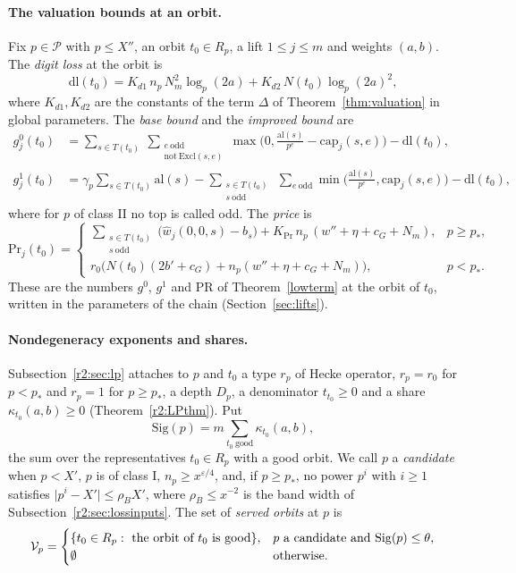 \paragraph{The valuation bounds at an orbit.} Fix $p\in\mathcal P$ with $p\le X''$, an orbit $t_0\in R_p$, a lift $1\le j\le m$ and weights $(a,b)$. The \emph{digit loss} at the orbit is
\[
\mathrm{dl}(t_0)=K_{d1}\,n_p\,N_m^2\log_p(2a)+K_{d2}\,N(t_0)\log_p(2a)^2,
\]
where $K_{d1},K_{d2}$ are the constants of the term $\Delta$ of Theorem~\ref{thm:valuation} in global parameters. The \emph{base bound} and the \emph{improved bound} are
\begin{align}
g^0_j(t_0)&=\sum_{s\in T(t_0)}\ \sum_{\substack{e\ \mathrm{odd}\\ \mathrm{not}\ \mathrm{Excl}(s,e)}}\max\Big(0,\frac{\mathrm{al}(s)}{p^e}-\mathrm{cap}_j(s,e)\Big)-\mathrm{dl}(t_0),\label{r2:g0}\\
g^1_j(t_0)&=\gamma_p\sum_{s\in T(t_0)}\mathrm{al}(s)-\sum_{\substack{s\in T(t_0)\\ s\ \mathrm{odd}}}\ \sum_{e\ \mathrm{odd}}\min\Big(\frac{\mathrm{al}(s)}{p^e},\mathrm{cap}_j(s,e)\Big)-\mathrm{dl}(t_0),\label{r2:g1}
\end{align}
where for $p$ of class II no top is called odd. The \emph{price} is
\begin{equation}\label{r2:price}
\mathrm{Pr}_j(t_0)=\begin{cases}\displaystyle\sum_{\substack{s\in T(t_0)\\ s\ \mathrm{odd}}}\big(\hat w_j(0,0,s)-b_s\big)+K_{\mathrm{Pr}}\,n_p\,(w''+\eta+c_G+N_m),&p\ge p_*,\\[2ex]
r_0\big(N(t_0)(2b'+c_G)+n_p(w''+\eta+c_G+N_m)\big),&p<p_*.\end{cases}
\end{equation}
These are the numbers $g^0$, $g^1$ and $\mathrm{PR}$ of Theorem~\ref{lowterm} at the orbit of $t_0$, written in the parameters of the chain (Section~\ref{sec:lifts}).

\paragraph{Nondegeneracy exponents and shares.} Subsection~\ref{r2:sec:lp} attaches to $p$ and $t_0$ a type $r_p$ of Hecke operator, $r_p=r_0$ for $p<p_*$ and $r_p=1$ for $p\ge p_*$, a depth $D_p$, a denominator $t_{t_0}\ge0$ and a share $\kappa_{t_0}(a,b)\ge0$ (Theorem~\ref{r2:LPthm}). Put
\[
\mathrm{Sig}(p)=m\sum_{t_0\ \mathrm{good}}\kappa_{t_0}(a,b),
\]
the sum over the representatives $t_0\in R_p$ with a good orbit. We call $p$ a \emph{candidate} when $p<X'$, $p$ is of class I, $n_p\ge x^{\varepsilon/4}$, and, if $p\ge p_*$, no power $p^i$ with $i\ge1$ satisfies $\lvert p^i-X'\rvert\le\rho_BX'$, where $\rho_B\le x^{-2}$ is the band width of Subsection~\ref{r2:sec:lossinputs}. The set of \emph{served orbits} at $p$ is
\[
\cV_p=\begin{cases}\{t_0\in R_p:\ \text{the orbit of }t_0\text{ is good}\},&p\text{ a candidate and }\mathrm{Sig}(p)\le\theta,\\ \emptyset&\text{otherwise.}\end{cases}
\]

